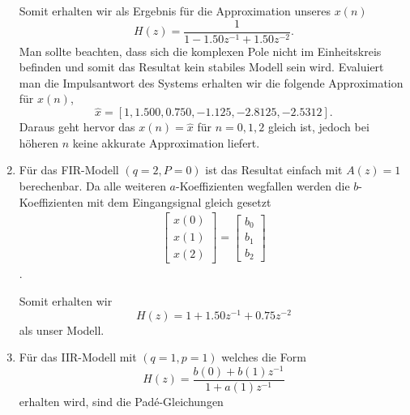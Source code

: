 \begin{beispiel}
\begin{enumerate}
Somit erhalten wir als Ergebnis für die Approximation unseres $x(n)$ 
\begin{equation}
H(z)=\frac{1}{1-1.50 z^{-1}+1.50 z^{-2}}.
\end{equation}
Man sollte beachten, dass sich die komplexen Pole nicht im Einheitskreis befinden und somit das Resultat kein stabiles Modell sein wird.
Evaluiert man die Impulsantwort des Systems erhalten wir die folgende Approximation für $x(n)$,
\begin{equation}
\hat{x}=[1,1.500,0.750,-1.125,-2.8125,-2.5312].
\end{equation}
Daraus geht hervor das $x(n)= \hat{x}$ für $n= 0,1,2$ gleich ist, jedoch bei höheren $n$ keine akkurate Approximation liefert.

\item Für das FIR-Modell $(q=2,P=0)$ ist das Resultat einfach mit $A(z)=1$ berechenbar.
Da alle weiteren $a$-Koeffizienten wegfallen werden die $b$-Koeffizienten  mit dem Eingangsignal gleich gesetzt 
\begin{equation}\begin{array}{r}

{\left[\begin{array}{l}
	x(0) \\
	x(1) \\
	x(2)
\end{array}\right]
=
\left[\begin{array}{l}
	b_0 \\
	b_1 \\
	b_2
	\end{array}\right]}
\end{array}\end{equation}.

Somit erhalten wir 
\begin{equation}
H(z)=1+1.50 z^{-1}+0.75 z^{-2}
\end{equation}
als unser Modell.

\item Für das IIR-Modell mit $(q=1,p=1)$ welches die Form
\begin{equation}
H(z)=\frac{b(0)+b(1) z^{-1}}{1+a(1) z^{-1}}
\end{equation}
erhalten wird, sind die Padé-Gleichungen


\end{enumerate}
\end{beispiel}
